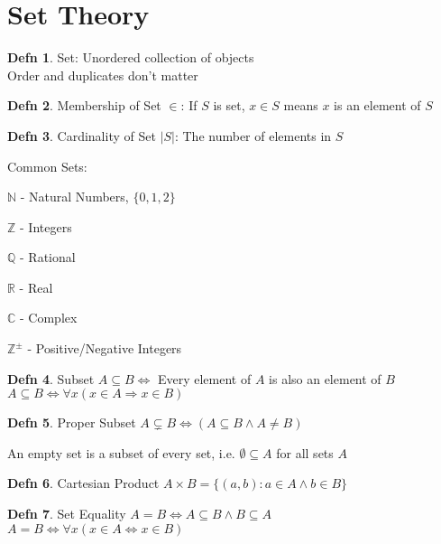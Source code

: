 \documentclass[a4paper]{article}
\theoremstyle{definition}
\newtheorem*{defn}{Defn}
\newenvironment{theorem}[1]
  {\renewcommand\theinnertheorem{#1}\innertheorem}
  {\endinnertheorem}
\begin{document}
\section{Set Theory}

\begin{defn}{Set: Unordered collection of objects}\\
  Order and duplicates don't matter
\end{defn}

\begin{defn}{Membership of Set $\in$: }
  If $S$ is set, $x \in S$ means $x$ is an element of $S$
\end{defn}

\begin{defn}{Cardinality of Set $|S|$: }
  The number of elements in $S$
\end{defn}

Common Sets:

$\mathbb{N}$ - Natural Numbers, $\{0, 1, 2\}$

$\mathbb{Z}$ - Integers

$\mathbb{Q}$ - Rational

$\mathbb{R}$ - Real

$\mathbb{C}$ - Complex

$\mathbb{Z}^\pm$ - Positive/Negative Integers

\begin{defn}{Subset}
  $A \subseteq B \Leftrightarrow$ Every element of $A$ is also an element of $B$\\
  $A \subseteq B \Leftrightarrow \forall x(x\in A \Rightarrow x \in B)$
\end{defn}

\begin{defn}{Proper Subset}
  $A \subsetneq B \Leftrightarrow (A \subseteq B \land A \not = B)$
\end{defn}

\begin{theorem}{6.2.4}
  An empty set is a subset of every set, i.e. $\emptyset \subseteq A$ for all sets $A$
\end{theorem}

\begin{defn}{Cartesian Product}
  $A \times B = \{(a, b): a \in A \land b \in B\} $
\end{defn}

\begin{defn}{Set Equality}
  $A = B \Leftrightarrow A \subseteq B \land B \subseteq A$ \\
  $A = B \Leftrightarrow \forall x (x \in A \Leftrightarrow x \in B)$
\end{defn}
\end{document}
